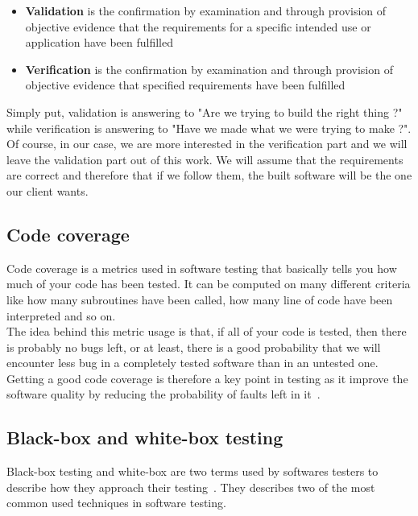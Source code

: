 \documentclass[12pt]{article}
\begin{document}
\begin{itemize}

\item \textbf{Validation} is the confirmation by examination and through provision of objective evidence that the requirements for a specific intended use or application have been fulfilled~\cite{IEEEStd1990}
\item \textbf{Verification} is the confirmation by examination and through provision of objective evidence that specified requirements have been fulfilled~\cite{IEEEStd1990}

\end{itemize}

Simply put, validation is answering to "Are we trying to build the right thing ?" while verification is answering to "Have we made what we were trying to make ?". Of course, in our case, we are more interested in the verification part and we will leave the validation part out of this work. We will assume that the requirements are correct and therefore that if we follow them, the built software will be the one our client wants.

\subsection{Code coverage}

Code coverage is a metrics used in software testing that basically tells you how much of your code has been tested. It can be computed on many different criteria like how many subroutines have been called, how many line of code have been interpreted and so on.\\

The idea behind this metric usage is that, if all of your code is tested, then there is probably no bugs left, or at least, there is a good probability that we will encounter less bug in a completely tested software than in an untested one. Getting a good code coverage is therefore a key point in testing as it improve the software quality by reducing the probability of faults left in it~\cite{TestingForContinuousDelivery:2016}.

\subsection{Black-box and white-box testing}

Black-box testing and white-box are two terms used by softwares testers to describe how they approach their testing~\cite{Patton:2005}. They describes two of the most common used techniques in software testing.
\end{document}
